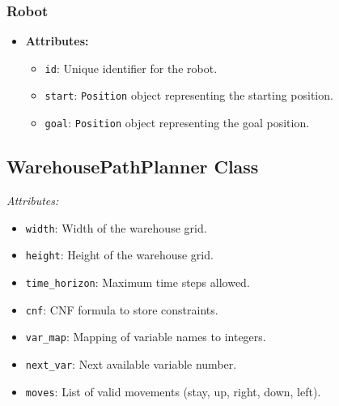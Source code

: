 \documentclass[8pt]{article}
\begin{document}
\subsubsection*{Robot}
\begin{itemize}
    \item \textbf{Attributes:}
    \begin{itemize}
        \item \texttt{id}: Unique identifier for the robot.
        \item \texttt{start}: \texttt{Position} object representing the starting position.
        \item \texttt{goal}: \texttt{Position} object representing the goal position.
    \end{itemize}
\end{itemize}

\subsection{WarehousePathPlanner Class}
\emph{Attributes:}
\begin{itemize}
    \item \texttt{width}: Width of the warehouse grid.
    \item \texttt{height}: Height of the warehouse grid.
    \item \texttt{time\_horizon}: Maximum time steps allowed.
    \item \texttt{cnf}: CNF formula to store constraints.
    \item \texttt{var\_map}: Mapping of variable names to integers.
    \item \texttt{next\_var}: Next available variable number.
    \item \texttt{moves}: List of valid movements (stay, up, right, down, left).
\end{itemize}
\end{document}
